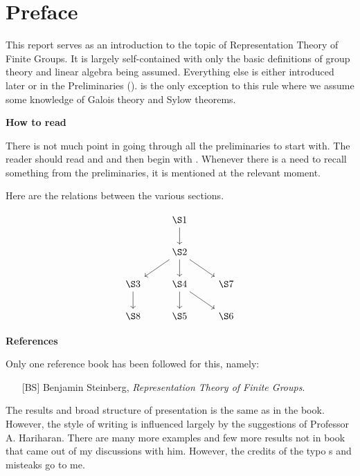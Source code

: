 \section*{Preface}
This report serves as an introduction to the topic of Representation Theory of Finite Groups. It is largely self-contained with only the basic definitions of group theory and linear algebra being assumed. Everything else is either introduced later or in the Preliminaries ().  is the only exception to this rule where we assume some knowledge of Galois theory and Sylow theorems.

\textbf{How to read}

There is not much point in going through all the preliminaries to start with. The reader should read  and  and then begin with . Whenever there is a need to recall something from the preliminaries, it is mentioned at the relevant moment.

Here are the relations between the various sections.

\begin{equation*} 
	\begin{tikzcd}
	              & \S1 \arrow[d]                       &     \\
	              & \S2 \arrow[d] \arrow[ld] \arrow[rd] &     \\
	\S3 \arrow[d] & \S4 \arrow[d] \arrow[rd]            & \S7 \\
	\S8           & \S5                                 & \S6
	\end{tikzcd}
\end{equation*}

\textbf{References}

Only one reference book has been followed for this, namely:

\begin{itemize}
	\item[{[BS]}] Benjamin Steinberg, \emph{Representation Theory of Finite Groups}.
\end{itemize}

The results and broad structure of presentation is the same as in the book. However, the style of writing is influenced largely by the suggestions of Professor A. Hariharan. There are many more examples and few more results not in book that came out of my discussions with him. However, the credits of the typo s and misteaks go to me.